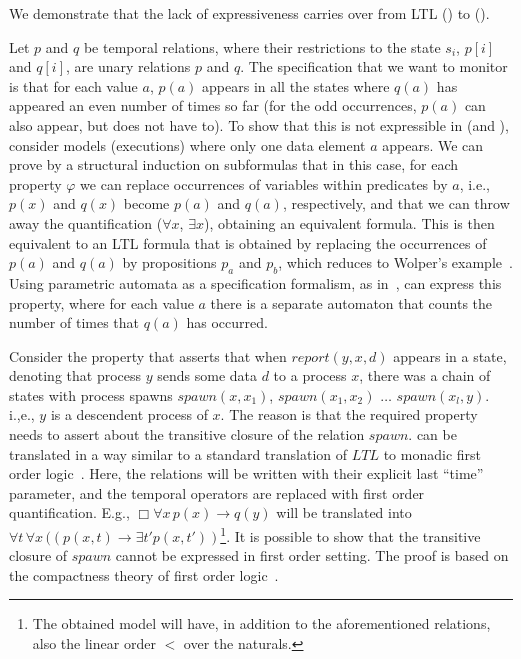 

We demonstrate that the lack of expressiveness
carries over from LTL (\PLTL{}) to \FLTL{} (\PFLTL{}).

\vspace{1ex}
Let $p$ and $q$ be temporal relations, where their
restrictions to the state $s_i$, $p[i]$ and $q[i]$, are unary relations $p$ and $q$. The
specification that we want to monitor is that for each value
$a$, $p(a)$ appears in all the states where $q(a)$ has appeared an even number of times so far (for the odd occurrences, $p(a)$ can also appear, but does not have to). To show that this is not expressible in \FLTL{} (and \PFLTL{}),
consider models (executions) where only one data element $a$ appears. We can prove by a structural induction on subformulas
that in this case, for each property $\varphi$
we can replace occurrences of variables within
predicates by $a$, i.e., $p(x)$ and $q(x)$ become $p(a)$
and $q  (a )$, respectively, and that we can throw away
the quantification ($\forall x$, $\exists x$), obtaining
an equivalent formula. This is then equivalent to
an LTL formula that is obtained by replacing
the occurrences of $p(a)$ and $q(a)$ by propositions
$p_a$ and $p_b$, which reduces to Wolper's example~\cite{Wolper}.
Using parametric automata as a specification formalism, as in~\cite{Grum,havelund-rv-data-2018,Meredith2011,Reger2015}, can express this property, 
where for each value $a$ there is a separate automaton that counts the number of times that $q(a)$ has occurred.

\vspace{1ex}
Consider the property that asserts that when
$\mathit{report}(y , x, d)$ appears
in a state, denoting that  process 
$y$ sends some data $d$ to a process $x$,
there was a chain of states with process spawns
$\mathit{spawn}(x, x_1)$, $\mathit{spawn} (x_1, x_2)$ $\ldots$
$\mathit{spawn}(x_l , y)$. i.,e., $y$ is a descendent process of $x$. The reason
is that the required property needs to
assert about the transitive closure
of the relation $\mathit{spawn}$. 
\FLTL{} can be translated in a way similar to a standard translation of $LTL$ to monadic first order logic~\cite{Thomas}. Here, the relations will be written with their explicit last ``time'' parameter, and the temporal operators are replaced with first order quantification.
E.g., $\Box \forall x \, p(x) \rightarrow q(y)$ will be translated into $\forall t \, \forall x \, ((p(x, t) \rightarrow \exists t' p(x, t') )$\footnote{The obtained model will have, in addition
to the aforementioned relations, also
the linear order $<$ over the naturals.}.
It is possible to show that the transitive closure of $\mathit{spawn}$ cannot be expressed in first order setting. The proof is based on the
compactness theory of first order logic~\cite{Flum}.

